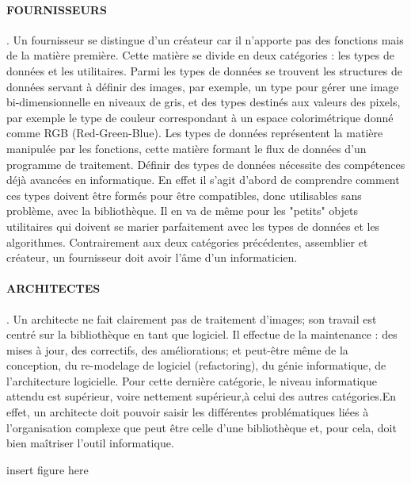 \paragraph{FOURNISSEURS} . Un fournisseur se distingue d'un créateur car il n'apporte pas des fonctions
mais de la matière première. Cette matière se divide en deux catégories : les types de données et les
utilitaires. Parmi les types de données se trouvent les structures de données servant à définir des
images, par exemple, un type pour gérer une image bi-dimensionnelle en niveaux de gris, et des
types destinés aux valeurs des pixels, par exemple le type de couleur correspondant à un espace
colorimétrique donné comme RGB (Red-Green-Blue). Les types de données représentent la matière
manipulée par les fonctions, cette matière formant le flux de données d'un programme de traitement.
Définir des types de données nécessite des compétences déjà avancées en informatique. En effet il
s'agit d'abord de comprendre comment ces types doivent être formés pour être compatibles, donc
utilisables sans problème, avec la bibliothèque. Il en va de même pour les "petits" objets utilitaires
qui doivent se marier parfaitement avec les types de données et les algorithmes. Contrairement
aux deux catégories précédentes, assemblier et créateur, un fournisseur doit avoir l'âme d'un
informaticien.
\paragraph{ARCHITECTES} . Un architecte ne fait clairement pas de traitement d'images; son travail est
centré sur la bibliothèque en tant que logiciel. Il effectue de la maintenance : des mises à jour,
des correctifs, des améliorations; et peut-être même de la conception, du re-modelage de logiciel
(refactoring), du génie informatique, de l'architecture logicielle. Pour cette dernière catégorie, le
niveau informatique attendu est supérieur, voire nettement supérieur,à celui des autres catégories.En
effet, un architecte doit pouvoir saisir les différentes problématiques liées à l'organisation complexe
que peut être celle d'une bibliothèque et, pour cela, doit bien maîtriser l'outil informatique.

insert figure here


